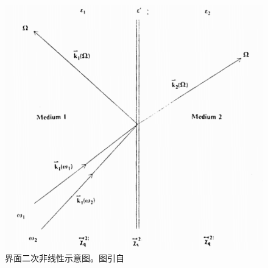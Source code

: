 \documentclass[UTF8,a4paper,cs4size,hyperref]{ctexart}
\begin{document}
\begin{figure}
\centering
\includegraphics[scale=1 ]{surface.png}
\caption{界面二次非线性示意图。图引自\cite{heinz1991second}}
\label{pic:surface}
\end{figure}
\end{document}
